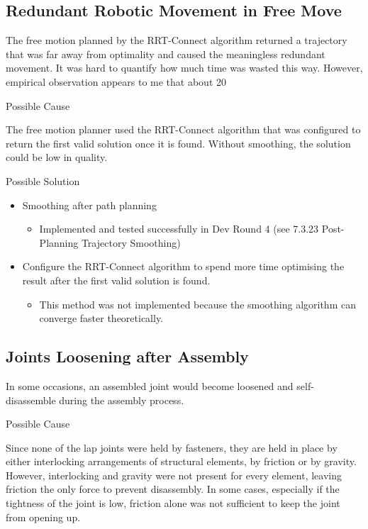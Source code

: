 \subsection{Redundant Robotic Movement in Free Move}
The free motion planned by the RRT-Connect algorithm returned a trajectory that was far away from optimality and caused the meaningless redundant movement. It was hard to quantify how much time was wasted this way. However, empirical observation appears to me that about 20%

Possible Cause

The free motion planner used the RRT-Connect algorithm that was configured to return the first valid solution once it is found. Without smoothing, the solution could be low in quality.

Possible Solution
\begin{itemize}
    \item Smoothing after path planning
    \begin{itemize}
        \item Implemented and tested successfully in Dev Round 4 (see 7.3.23 Post-Planning Trajectory Smoothing)
    \end{itemize}
    \item Configure the RRT-Connect algorithm to spend more time optimising the result after the first valid solution is found.
    \begin{itemize}
        \item This method was not implemented because the smoothing algorithm can converge faster theoretically.
    \end{itemize}
\end{itemize}

\subsection{Joints Loosening after Assembly}
In some occasions, an assembled joint would become loosened and self-disassemble during the assembly process. 

Possible Cause

Since none of the lap joints were held by fasteners, they are held in place by either interlocking arrangements of structural elements, by friction or by gravity. However, interlocking and gravity were not present for every element, leaving friction the only force to prevent disassembly. In some cases, especially if the tightness of the joint is low, friction alone was not sufficient to keep the joint from opening up.

